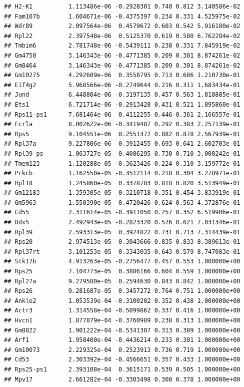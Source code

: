 \documentclass[
]{article}
\begin{document}
\begin{verbatim}
## H2-K1          1.113486e-06 -0.2928301 0.740 0.812 3.140586e-02
## Fam107b        1.604671e-06 -0.4375397 0.234 0.331 4.525975e-02
## Wdr89          2.097564e-06  0.4579672 0.603 0.542 5.916180e-02
## Rpl22          2.397548e-06  0.5125370 0.619 0.580 6.762284e-02
## Tmbim6         2.781748e-06 -0.5439111 0.238 0.331 7.845919e-02
## Gm4750         3.146343e-06 -0.4771385 0.209 0.301 8.874261e-02
## Gm8464         3.146343e-06 -0.4771385 0.209 0.301 8.874261e-02
## Gm10275        4.292609e-06  0.3558795 0.713 0.686 1.210730e-01
## Eif4g2         5.968566e-06 -0.2749644 0.216 0.311 1.683434e-01
## Jund           6.448804e-06 -0.3197135 0.457 0.563 1.818885e-01
## Ets1           6.721714e-06 -0.2913428 0.431 0.521 1.895860e-01
## Rps11-ps1      7.681464e-06  0.4112255 0.446 0.361 2.166557e-01
## Fcrla          8.002622e-06 -0.3419487 0.292 0.383 2.257139e-01
## Rps5           9.104551e-06  0.2551372 0.882 0.878 2.567939e-01
## Rpl37a         9.227806e-06  0.3912455 0.693 0.641 2.602703e-01
## Rpl39-ps       1.063727e-05  0.4086295 0.730 0.710 3.000242e-01
## Tmem123        1.120288e-05 -0.3623426 0.224 0.310 3.159772e-01
## Prkcb          1.162550e-05 -0.3512114 0.218 0.304 3.278971e-01
## Rpl18          1.245860e-05  0.3378783 0.818 0.820 3.513949e-01
## Gm12183        1.359305e-05 -0.3210718 0.351 0.454 3.833919e-01
## Gm5963         1.550390e-05  0.4720426 0.624 0.563 4.372876e-01
## Cd55           2.311614e-05 -0.3911050 0.257 0.352 6.519906e-01
## Ddx5           2.492943e-05 -0.2823320 0.526 0.621 7.031346e-01
## Rpl39          2.593313e-05  0.3924822 0.731 0.713 7.314439e-01
## Rps20          2.974513e-05  0.3043666 0.835 0.833 8.389613e-01
## Rpl37rt        3.101253e-05  0.3343035 0.643 0.579 8.747083e-01
## Stk17b         4.913263e-05 -0.2756477 0.457 0.553 1.000000e+00
## Rps25          7.104773e-05  0.3886166 0.604 0.559 1.000000e+00
## Rpl27a         9.279580e-05  0.2594630 0.843 0.842 1.000000e+00
## Rps26          9.281687e-05  0.3457272 0.764 0.751 1.000000e+00
## Ankle2         1.053539e-04 -0.3100202 0.352 0.438 1.000000e+00
## Actr3          1.314558e-04 -0.5099862 0.337 0.416 1.000000e+00
## Hvcn1          1.877879e-04 -0.3760989 0.238 0.313 1.000000e+00
## Gm8822         1.901222e-04 -0.5341307 0.313 0.389 1.000000e+00
## Arf1           1.958400e-04 -0.4436214 0.233 0.301 1.000000e+00
## Gm10073        2.229325e-04  0.2523913 0.736 0.719 1.000000e+00
## Cd53           2.303392e-04 -0.4566651 0.357 0.433 1.000000e+00
## Rps25-ps1      2.393108e-04  0.3615171 0.539 0.505 1.000000e+00
## Mpv17          2.661282e-04 -0.3303498 0.300 0.378 1.000000e+00

\end{verbatim}
\end{document}
